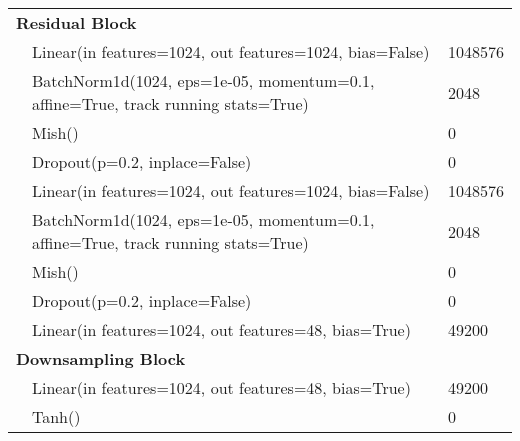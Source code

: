 \begin{center}
\begin{tabular}{ p{} p{}  p{}}
        \multicolumn{2}{l}{\textbf{Residual Block}}     &                                                                                                         \\
                                                        & Linear(in features=1024, out features=1024, bias=False)                           & 1048576             \\
                                                        & BatchNorm1d(1024, eps=1e-05, momentum=0.1, affine=True, track running stats=True) & 2048                \\
                                                        & Mish()                                                                            & 0                   \\
                                                        & Dropout(p=0.2, inplace=False)                                                     & 0                   \\
                                                        & Linear(in features=1024, out features=1024, bias=False)                           & 1048576             \\
                                                        & BatchNorm1d(1024, eps=1e-05, momentum=0.1, affine=True, track running stats=True) & 2048                \\
                                                        & Mish()                                                                            & 0                   \\
                                                        & Dropout(p=0.2, inplace=False)                                                     & 0                   \\
                                                        & Linear(in features=1024, out features=48, bias=True)                              & 49200               \\
        \multicolumn{2}{l}{\textbf{Downsampling Block}} &                                                                                                         \\

                                                        & Linear(in features=1024, out features=48, bias=True)                              & 49200               \\
                                                        & Tanh()                                                                            & 0                   \\
    \end{tabular}
\end{center}


